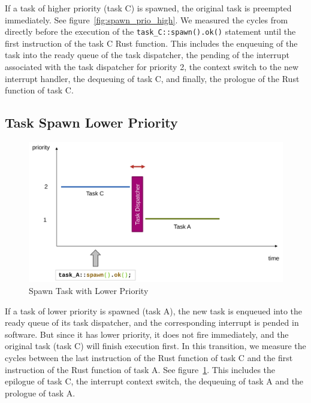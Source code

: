 If a task of higher priority (task C) is spawned, the original task is preempted immediately. See figure~\ref{fig:spawn_prio_high}.
We measured the cycles from directly before the execution of the \texttt{task_C::spawn().ok()} statement until the first instruction of the task C Rust function.
This includes the enqueuing of the task into the ready queue of the task dispatcher, the pending of the interrupt associated with the task dispatcher for priority 2, the context switch to the new interrupt handler, the dequeuing of task C, and finally, the prologue of the Rust function of task C.

\subsection{Task Spawn Lower Priority}

\begin{figure}
  \centerfloat
  \includegraphics[width=\textwidth]{fig/spawn_prio_low.svg.pdf}
  \caption{Spawn Task with Lower Priority}%
  \label{fig:spawn_prio_low}
\end{figure}

If a task of lower priority is spawned (task A), the new task is enqueued into the ready queue of its task dispatcher, and the corresponding interrupt is pended in software. But since it has lower priority, it does not fire immediately, and the original task (task C) will finish execution first.
In this transition, we measure the cycles between the last instruction of the Rust function of task C and the first instruction of the Rust function of task A. See figure~\ref{fig:spawn_prio_low}.
This includes the epilogue of task C, the interrupt context switch, the dequeuing of task A and the prologue of task A.

